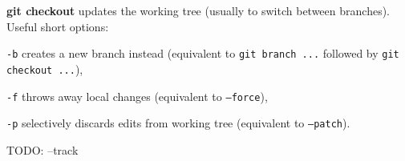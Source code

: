 %

\textbf{git checkout} updates the working tree (usually to switch between branches).
Useful short options:
\begin{compactenum}
\item [\texttt{-b}] creates a new branch instead (equivalent to \texttt{git branch ...} followed by \texttt{git checkout ...}),
\item [\texttt{-f}] throws away local changes (equivalent to \texttt{--force}),
\item [\texttt{-p}] selectively discards edits from working tree (equivalent to \texttt{--patch}).
\end{compactenum}

TODO: --track

%